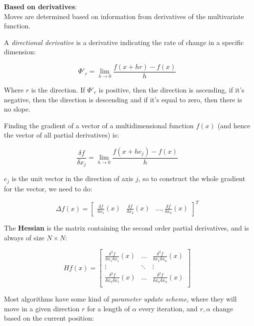 \begin{description}
  \item \textbf{Based on derivatives}:\\
    Moves are determined based on information from derivatives of the 
    multivariate function.

    A \textit{directional derivative} is a derivative indicating the rate of
    change in a specific dimension:


    \[
      \Phi'_r = \lim_{h \rightarrow 0}\frac{f(x + hr) - f(x)}{h}
    \]

    Where $r$ is the direction. If $\Phi'_r$ is positive, then the direction is
    ascending, if it's negative, then the direction is descending and if it's
    equal to zero, then there is no slope.

    Finding the gradient of a vector of a multidimensional function $f(x)$ (and
    hence the vector of all partial derivatives) is:

    \[
      \frac{\delta f}{\delta x_j} =
        \lim_{h \rightarrow 0} \frac{f(x + he_j) - f(x)}{h}
    \]

    $e_j$ is the unit vector in the direction of axis $j$, so to construct the 
    whole gradient for the vector, we need to do:

    \[
      \Delta f(x) = \begin{bmatrix}
        \frac{\delta f}{\delta x_1}(x) & \frac{\delta f}{\delta x_2}(x) & \dots,
        \frac{\delta f}{\delta x_n}(x)
      \end{bmatrix}^{T}
    \]

    The \textbf{Hessian} is the matrix containing the second order partial
    derivatives, and is always of size $N \times N$:

    \[
      Hf(x) = \begin{bmatrix}
        \frac{\delta^2 f}{\delta x_1 \delta x_1}(x) & \dots &
          \frac{\delta^2 f}{\delta x_1 \delta x_n}(x)\\
        \vdots & \ddots & \vdots\\
        \frac{\delta^2 f}{\delta x_n \delta x_1}(x) & \dots &
          \frac{\delta^2 f}{\delta x_n \delta x_n}(x)\\
      \end{bmatrix}
    \]

    Most algorithms have some kind of \textit{parameter update scheme}, where
    they will move in a given direction $r$ for a length of $\alpha$ every
    iteration,  and $r, \alpha$ change based on the current position:


\end{description}
